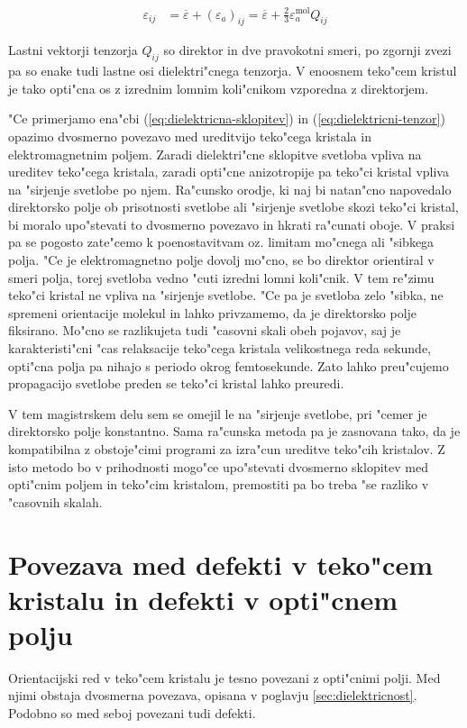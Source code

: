 \documentclass[12pt,twoside,openright,final]{report}
\begin{document}
\begin{align}
\label{eq:dielektricni-tenzor}
 \varepsilon_{ij} &= \overline\varepsilon + (\varepsilon_a)_{ij} = \overline\varepsilon + \frac{2}{3}\varepsilon_a^{\mathrm{mol}} Q_{ij}
\end{align}

Lastni vektorji tenzorja $Q_{ij}$ so direktor in dve pravokotni smeri, po zgornji zvezi pa so enake tudi lastne osi dielektri"cnega tenzorja. 
V enoosnem teko"cem kristul je tako opti"cna os z izrednim lomnim koli"cnikom vzporedna z direktorjem. 

"Ce primerjamo ena"cbi (\ref{eq:dielektricna-sklopitev}) in (\ref{eq:dielektricni-tenzor}) opazimo dvosmerno povezavo med ureditvijo teko"cega kristala in elektromagnetnim poljem. 
Zaradi dielektri"cne sklopitve svetloba vpliva na ureditev teko"cega kristala, zaradi opti"cne anizotropije pa teko"ci kristal vpliva na "sirjenje svetlobe po njem. 
Ra"cunsko orodje, ki naj bi natan"cno napovedalo direktorsko polje ob prisotnosti svetlobe ali "sirjenje svetlobe skozi teko"ci kristal, bi moralo upo"stevati to dvosmerno povezavo in hkrati ra"cunati oboje. 
V praksi pa se pogosto zate"cemo k poenostavitvam oz. limitam mo"cnega ali "sibkega polja. 
"Ce je elektromagnetno polje dovolj mo"cno, se bo direktor orientiral v smeri polja, torej svetloba vedno "cuti izredni lomni koli"cnik. 
V tem re"zimu teko"ci kristal ne vpliva na "sirjenje svetlobe. 
"Ce pa je svetloba zelo "sibka, ne spremeni orientacije molekul in lahko privzamemo, da je direktorsko polje fiksirano. 
Mo"cno se razlikujeta tudi "casovni skali obeh pojavov, saj je karakteristi"cni "cas relaksacije teko"cega kristala velikostnega reda sekunde, opti"cna polja pa nihajo s periodo okrog femtosekunde. 
Zato lahko preu"cujemo propagacijo svetlobe preden se teko"ci kristal lahko preuredi. 

V tem magistrskem delu sem se omejil le na "sirjenje svetlobe, pri "cemer je direktorsko polje konstantno. 
Sama ra"cunska metoda pa je zasnovana tako, da je kompatibilna z obstoje"cimi programi za izra"cun ureditve teko"cih kristalov\cite{ravnik-zumer-ldg}. 
Z isto metodo bo v prihodnosti mogo"ce upo"stevati dvosmerno sklopitev med opti"cnim poljem in teko"cim kristalom, premostiti pa bo treba "se razliko v "casovnih skalah. 

\section{Povezava med defekti v teko"cem kristalu in defekti v opti"cnem polju}
Orientacijski red v teko"cem kristalu je tesno povezani z opti"cnimi polji. 
Med njimi obstaja dvosmerna povezava, opisana v poglavju \ref{sec:dielektricnost}. 
Podobno so med seboj povezani tudi defekti. 
\end{document}

